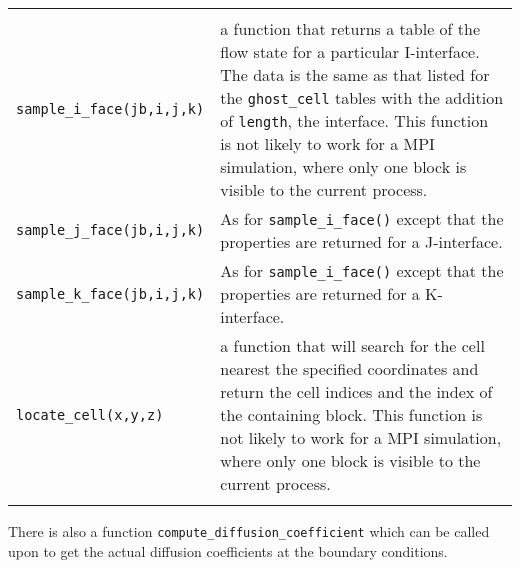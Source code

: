 \begin{tabular}{ll}
{} \\
 \texttt{sample\_i\_face(jb,i,j,k)} & \parbox{10cm}{a function that returns a table of 
                                      the flow state for a particular I-interface.  The data is the same as that
                                      listed for the \texttt{ghost\_cell} tables with the addition of \texttt{length},
                                      the interface.  This function is not likely to work for a MPI simulation,
                                      where only one block is visible to the current process.
} \\
 \texttt{sample\_j\_face(jb,i,j,k)} & \parbox{10cm}{As for \texttt{sample\_i\_face()} except that the properties
                                      are returned for a J-interface.
} \\
 \texttt{sample\_k\_face(jb,i,j,k)} & \parbox{10cm}{As for \texttt{sample\_i\_face()} except that the properties
                                      are returned for a K-interface.
} \\
 \noalign{\smallskip} \hline \noalign{\smallskip}
 \texttt{locate\_cell(x,y,z)} & \parbox{10cm}{a function that will search for the cell nearest 
                                      the specified coordinates and return the cell indices
                                      and the index of the containing block.  This function 
                                      is not likely to work for a MPI simulation,
                                      where only one block is visible to the current process.} \\
 \noalign{\smallskip} \hline \noalign{\smallskip}
\end{tabular}

\noindent
There is also a function \texttt{compute\_diffusion\_coefficient} which can be called upon
to get the actual diffusion coefficients at the boundary conditions.

